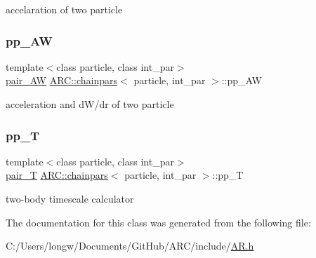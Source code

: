 accelaration of two particle 

\hypertarget{classARC_1_1chainpars_a1f5e1a080b4f7f81cadd1ec1058fba5b}{}\label{classARC_1_1chainpars_a1f5e1a080b4f7f81cadd1ec1058fba5b} 
\subsubsection{\texorpdfstring{pp\+\_\+\+AW}{pp\_AW}}
{\footnotesize\ttfamily template$<$class particle, class int\+\_\+par$>$ \\
\hyperlink{classARC_1_1chainpars_a766866c2e38b475767a4f8529624a378}{pair\+\_\+\+AW} \hyperlink{classARC_1_1chainpars}{A\+R\+C\+::chainpars}$<$ particle, int\+\_\+par $>$\+::pp\+\_\+\+AW}



acceleration and d\+W/dr of two particle 

\hypertarget{classARC_1_1chainpars_a09163b4b9e5f44755487b730b5089db4}{}\label{classARC_1_1chainpars_a09163b4b9e5f44755487b730b5089db4} 
\subsubsection{\texorpdfstring{pp\+\_\+T}{pp\_T}}
{\footnotesize\ttfamily template$<$class particle, class int\+\_\+par$>$ \\
\hyperlink{classARC_1_1chainpars_a343fccd377d7215a4af2e909f3f9acf6}{pair\+\_\+T} \hyperlink{classARC_1_1chainpars}{A\+R\+C\+::chainpars}$<$ particle, int\+\_\+par $>$\+::pp\+\_\+T}



two-\/body timescale calculator 



The documentation for this class was generated from the following file\+:\begin{DoxyCompactItemize}
\item 
C\+:/\+Users/longw/\+Documents/\+Git\+Hub/\+A\+R\+C/include/\hyperlink{AR_8h}{A\+R.\+h}\end{DoxyCompactItemize}
